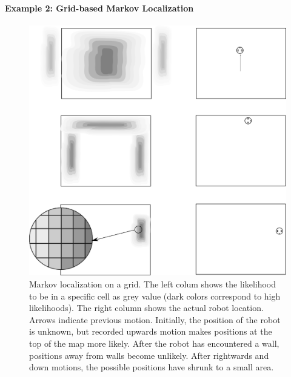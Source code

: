 \paragraph{Example 2: Grid-based Markov Localization}

\begin{figure}
	\centering
		\includegraphics[width=\textwidth]{figs/markov_grid_example}
	\caption{Markov localization on a grid. The left colum shows the likelihood to be in a specific cell as grey value (dark colors correspond to high likelihoods). The right column shows the actual robot location. Arrows indicate previous motion. Initially, the position of the robot is unknown, but recorded upwards motion makes positions at the top of the map more likely. After the robot has encountered a wall, positions away from walls become unlikely. After rightwards and down motions, the possible positions have shrunk to a small area.}
	\label{fig:markov_grid_example}
\end{figure}

